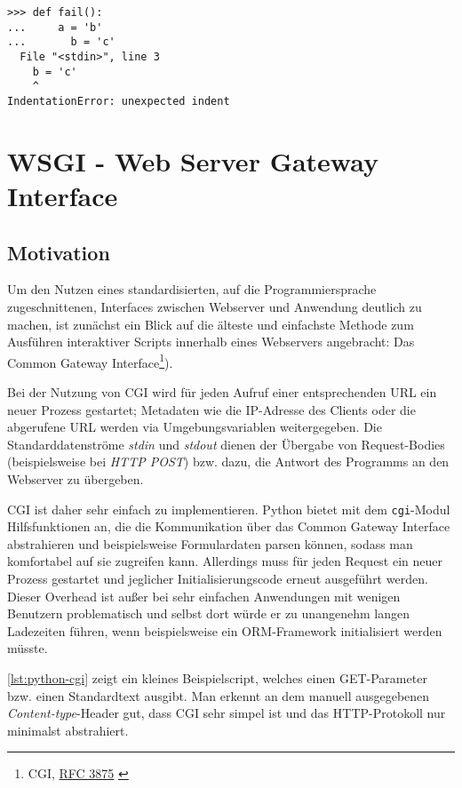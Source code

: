 \begin{lstlisting}[caption=Fehlerhafte Einrückung,label=lst:python-ident]
>>> def fail():
...     a = 'b'
...       b = 'c'
  File "<stdin>", line 3
    b = 'c'
    ^
IndentationError: unexpected indent
\end{lstlisting}




\section{WSGI - Web Server Gateway Interface}

\subsection{Motivation}

Um den Nutzen eines standardisierten, auf die Programmiersprache zugeschnittenen, Interfaces
zwischen Webserver und Anwendung deutlich zu machen, ist zunächst ein Blick auf die älteste und
einfachste Methode zum Ausführen interaktiver Scripts innerhalb eines Webservers angebracht: Das
Common Gateway Interface\footnote{CGI, \href{http://www.ietf.org/rfc/rfc3875}{RFC 3875}
\citep{rfc3875}}).

Bei der Nutzung von CGI wird für jeden Aufruf einer entsprechenden URL ein neuer Prozess gestartet;
Metadaten wie die IP-Adresse des Clients oder die abgerufene URL werden via Umgebungsvariablen
weitergegeben. Die Standarddatenströme \emph{stdin} und \emph{stdout} dienen der Übergabe von
Request-Bodies (beispielsweise bei \emph{HTTP POST}) bzw. dazu, die Antwort des Programms an den
Webserver zu übergeben.

CGI ist daher sehr einfach zu implementieren. Python bietet mit dem \lstinline{cgi}-Modul
Hilfsfunktionen an, die die Kommunikation über das Common Gateway Interface abstrahieren und
beispielsweise Formulardaten parsen können, sodass man komfortabel auf sie zugreifen kann.
Allerdings muss für jeden Request ein neuer Prozess gestartet und jeglicher Initialisierungscode
erneut ausgeführt werden. Dieser Overhead ist außer bei sehr einfachen Anwendungen mit wenigen
Benutzern problematisch und selbst dort würde er zu unangenehm langen Ladezeiten führen, wenn
beispielsweise ein ORM-Framework initialisiert werden müsste.

\autoref{lst:python-cgi} zeigt ein kleines Beispielscript, welches einen GET-Parameter bzw. einen
Standardtext ausgibt. Man erkennt an dem manuell ausgegebenen \emph{Content-type}-Header gut, dass
CGI sehr simpel ist und das HTTP-Protokoll nur minimalst abstrahiert.

